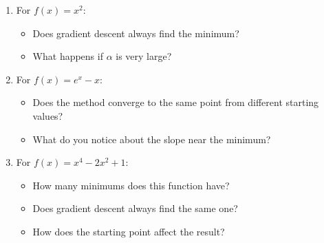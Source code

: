 \documentclass[11pt]{article}
\begin{document}
\begin{enumerate}

    \item For $f(x) = x^2$:
    \begin{itemize}
        \item Does gradient descent always find the minimum?
         \vspace{2cm}
        
        \item What happens if $\alpha$ is very large?
    \end{itemize}
    \vspace{2cm}

    \item For $f(x) = e^x - x$:
    \begin{itemize}
        \item Does the method converge to the same point from different starting values?
        \vspace{2cm}
        
        \item What do you notice about the slope near the minimum?
    \end{itemize}
    \vspace{2cm}

    \item For $f(x) = x^4 - 2x^2 + 1$:
    \begin{itemize}
        \item How many minimums does this function have?
         \vspace{2cm}
        
        \item Does gradient descent always find the same one?
         \vspace{2cm}
        
        \item How does the starting point affect the result?
    \end{itemize}

\end{enumerate}
\end{document}
